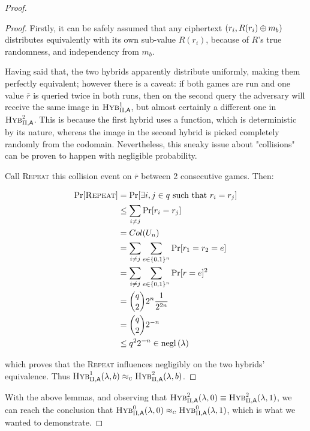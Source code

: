 \begin{proof}
    \begin{proof}
        Firstly, it can be safely assumed that any ciphertext $(r_i, R(r_i) \oplus m_b)$ distributes equivalently with its own sub-value $R(r_i)$, because of $R$'s true randomness, and independency from $m_b$.

        Having said that, the two hybrids apparently distribute uniformly, making them perfectly equivalent; however there is a caveat: if both games are run and one value $\overline{r}$ is queried twice in both runs, then on the second query the adversary will receive the same image in $\hybridg{1}$, but almost certainly a different one in $\hybridg{2}$. This is because the first hybrid uses a function, which is deterministic by its nature, whereas the image in the second hybrid is picked completely randomly from the codomain. Nevertheless, this sneaky issue about "collisions" can be proven to happen with negligible probability.

        Call \textsc{Repeat} this collision event on $\overline{r}$ between 2 consecutive games. Then:
        
        \begin{align*}
        \Pr[\textsc{Repeat}] &= \Pr[\exists i, j \in q \text{ such that } r_i = r_j] \\
            &\leq \sum_{i \neq j} \Pr[r_i=r_j] \\
            &= Col(U_n) \\
            &= \sum_{i \neq j} \sum_{e \in \{0, 1\}^n} \Pr[r_1 = r_2 = e] \\
            &= \sum_{i \neq j} \sum_{e \in \{0, 1\}^n} \Pr[r = e]^{2} \\
            &= {q \choose 2} 2^{n} \frac{1}{2^{2n}} \\
            &= {q \choose 2} 2^{-n} \\
            &\leq q^{2}2^{-n} \in \mathrm{negl}\left({\lambda}\right) 
        \end{align*} 


        which proves that the \textsc{Repeat} influences negligibly on the two hybrids' equivalence. Thus $\hybridg{1}(\lambda, b) \compindist \hybridg{2}(\lambda, b)$\footnotemark.
        
    \end{proof}

    With the above lemmas, and observing that $\hybridg{2}(\lambda, 0) \equiv \hybridg{2}(\lambda, 1)$, we can reach the conclusion that $\hybridg{0}(\lambda, 0) \compindist \hybridg{0}(\lambda, 1)$, which is what we wanted to demonstrate.

\end{proof}
